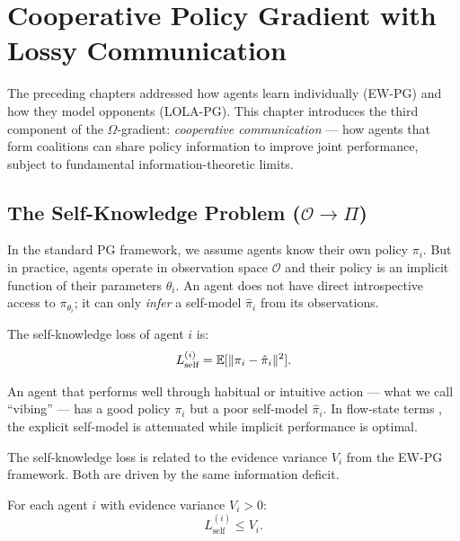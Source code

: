 \chapter{Cooperative Policy Gradient with Lossy Communication}\label{ch:cooperative-comm}

The preceding chapters addressed how agents learn individually (EW-PG) and how they model opponents (LOLA-PG). This chapter introduces the third component of the $\Omega$-gradient: \emph{cooperative communication} --- how agents that form coalitions can share policy information to improve joint performance, subject to fundamental information-theoretic limits.

\section{The Self-Knowledge Problem ($\mathcal{O} \to \Pi$)}

In the standard PG framework, we assume agents know their own policy $\pi_i$. But in practice, agents operate in observation space $\mathcal{O}$ and their policy is an implicit function of their parameters $\theta_i$. An agent does not have direct introspective access to $\pi_{\theta_i}$; it can only \emph{infer} a self-model $\hat{\pi}_i$ from its observations.

\begin{definition}
The self-knowledge loss of agent $i$ is:
\begin{equation}\label{eq:self-knowledge-loss}
    L_{\text{self}}^{(i)} = \mathbb{E}[\|\pi_i - \hat{\pi}_i\|^2].
\end{equation}
\end{definition}

An agent that performs well through habitual or intuitive action --- what we call ``vibing'' --- has a good policy $\pi_i$ but a poor self-model $\hat{\pi}_i$. In flow-state terms \citep{parvizi2024flow}, the explicit self-model is attenuated while implicit performance is optimal.

The self-knowledge loss is related to the evidence variance $V_i$ from the EW-PG framework. Both are driven by the same information deficit.

\begin{proposition}\label{prop:self-ev}
For each agent $i$ with evidence variance $V_i > 0$:
\begin{equation}
    L_{\text{self}}^{(i)} \leq V_i.
\end{equation}
\end{proposition}

